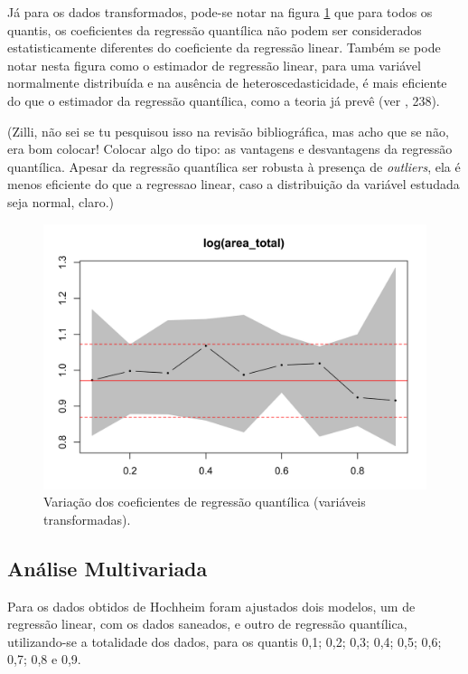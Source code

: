\documentclass[a4paper, 12pt]{article}
\begin{document}
Já para os dados transformados, pode-se notar na figura \ref{fig:coef2}
que para todos os quantis, os coeficientes da regressão quantílica não
podem ser considerados estatisticamente diferentes do coeficiente da
regressão linear. Também se pode notar nesta figura como o estimador de
regressão linear, para uma variável normalmente distribuída e na
ausência de heteroscedasticidade, é mais eficiente do que o estimador da
regressão quantílica, como a teoria já prevê (ver
\textcite{matloff2017}, 238).

(Zilli, não sei se tu pesquisou isso na revisão bibliográfica, mas acho
que se não, era bom colocar! Colocar algo do tipo: as vantagens e
desvantagens da regressão quantílica. Apesar da regressão quantílica ser
robusta à presença de \emph{outliers}, ela é menos eficiente do que a
regressao linear, caso a distribuição da variável estudada seja normal,
claro.)

\begin{figure}[H]

{\centering \includegraphics[width=0.7\linewidth]{images/coef2-1} 

}

\caption{Variação dos coeficientes de regressão quantílica (variáveis transformadas).}\label{fig:coef2}
\end{figure}

\hypertarget{analise-multivariada}{%
\subsection{Análise Multivariada}\label{analise-multivariada}}

Para os dados obtidos de Hochheim \autocite*[22-23]{hochheim} foram
ajustados dois modelos, um de regressão linear, com os dados saneados, e
outro de regressão quantílica, utilizando-se a totalidade dos dados,
para os quantis 0,1; 0,2; 0,3; 0,4; 0,5; 0,6; 0,7; 0,8 e 0,9.
\end{document}
